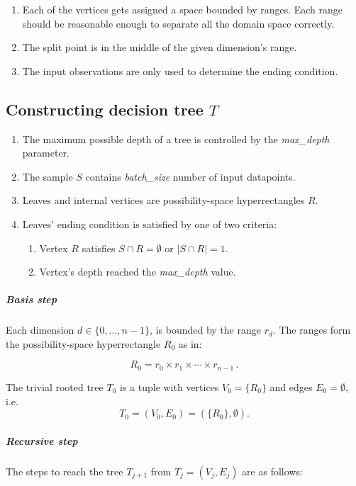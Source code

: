 \begin{enumerate}
    \item Each of the vertices gets assigned a space bounded by ranges. Each range should be reasonable enough to separate all the domain space correctly.
    \item The split point is in the middle of the given dimension’s range.
    \item The input observations are only used to determine the ending condition.
\end{enumerate}

\subsection{Constructing decision tree $T$}

\begin{enumerate}
    \item The maximum possible depth of a tree is controlled by the \emph{max\_depth} parameter.
    \item The sample \(S\) contains \emph{batch\_size} number of input datapoints.
    \item Leaves and internal vertices are possibility-space hyperrectangles \(R\). 
    \item Leaves' ending condition is satisfied by one of two criteria: 
\begin{enumerate}
    \item Vertex \(R\) satisfies \(S \cap R = \emptyset\) or \(| S \cap R | = 1\).
    \item Vertex's depth reached the \emph{max\_depth} value.
\end{enumerate}
\end{enumerate}



\subparagraph{Basis step}

Each dimension \(d \in\{0, \dots, n-1\}\), is bounded by the range \(r_d\). The ranges form the possibility-space hyperrectangle \(R_0\) as in:

\[R_0 =  r_0 \times r_1 \times \cdots \times r_{n-1}  \tag{xx}\,.\]

The trivial rooted tree \(T_0\) is a tuple with
vertices \(V_0 = \{R_0\}\) and edges \(E_0 = \emptyset\), i.e.
\[T_0= (V_0, E_0) = (\{R_0\},\emptyset).\]

\subparagraph{Recursive step}

The steps to reach the tree \(T_{j+1}\) from \(T_{j} = (V_j, E_j)\) are
as follows:

